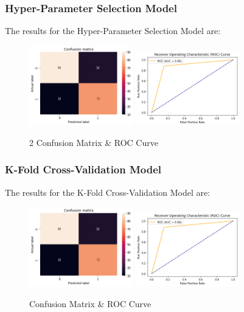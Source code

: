 \documentclass[conference]{IEEEtran}
\begin{document}
\subsubsection{Hyper-Parameter Selection Model}

The results for the Hyper-Parameter Selection Model are:

\begin{figure}[!h!]
    \includegraphics[width=4.5cm]{LogReg/lg2_1.png}%
    \includegraphics[width=4.5cm]{LogReg/lg2_2.png}%
    \caption{2 Confusion Matrix & ROC Curve}%
    \label{fig:conf_LogReg_2}%
\end{figure}

\subsubsection{K-Fold Cross-Validation Model}

The results for the K-Fold Cross-Validation Model are:

\begin{figure}[!h!]
    \includegraphics[width=4.5cm]{LogReg/lg3_1.png}%
    \includegraphics[width=4.5cm]{LogReg/lg3_2.png}%
    \caption{Confusion Matrix & ROC Curve}%
    \label{fig:conf_LogReg_3}%
\end{figure}
\end{document}
